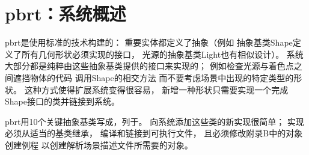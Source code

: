 \section{pbrt：系统概述}\label{sec:pbrt：系统概述}

pbrt是使用标准的技术构建的：
重要实体都定义了抽象（例如
抽象基类{\ttfamily Shape}定义了所有几何形状必须实现的接口，
光源的抽象基类{\ttfamily Light}也有相似设计）。
系统大部分都是纯粹由这些抽象基类提供的接口来实现的；
例如检查光源与着色点之间遮挡物体的代码
调用{\ttfamily Shape}的相交方法
而不要考虑场景中出现的特定类型的形状。
这种方式使得扩展系统变得很容易，
新增一种形状只需要实现一个完成{\ttfamily Shape}接口的类并链接到系统。

pbrt用10个关键抽象基类写成，列于。
向系统添加这些类的新实现很简单；
实现必须从适当的基类继承，
编译和链接到可执行文件，
且必须修改附录B中的对象创建例程
以创建解析场景描述文件所需要的对象。



